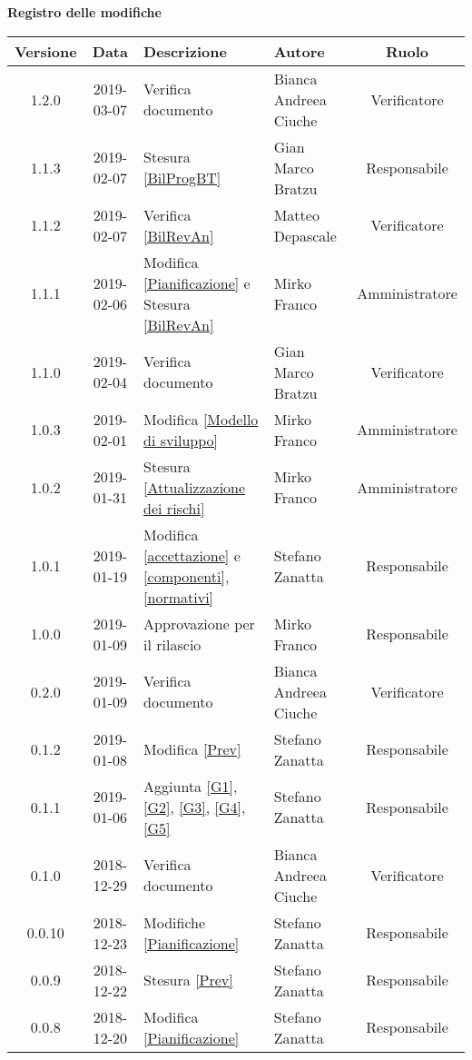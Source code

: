 	\begin{center}
		\textbf{Registro delle modifiche}
	\end{center}
	\begin{center}
		\begin{tabularx}{\textwidth}{|c|c|X|X|c|}
			\hline
			\textbf{Versione} & \textbf{Data} & \textbf{Descrizione} & \textbf{Autore} & \textbf{Ruolo} \\
			\hline
			1.2.0 & 2019-03-07 & Verifica documento & Bianca Andreea Ciuche & Verificatore \\			
			\hline
			1.1.3 & 2019-02-07 & Stesura \ref{BilProgBT} & Gian Marco Bratzu & Responsabile \\			
			\hline
			1.1.2 & 2019-02-07 & Verifica \ref{BilRevAn} & Matteo Depascale & Verificatore \\
			\hline
			1.1.1 & 2019-02-06 & Modifica \ref{Pianificazione} e Stesura \ref{BilRevAn} & Mirko Franco & Amministratore \\
			\hline
			1.1.0 & 2019-02-04 & Verifica documento & Gian Marco Bratzu & Verificatore\\
			\hline
			1.0.3 & 2019-02-01 & Modifica \ref{Modello di sviluppo} & Mirko Franco & Amministratore \\
			\hline
			1.0.2 & 2019-01-31 & Stesura \ref{Attualizzazione dei rischi} & Mirko Franco & Amministratore \\
			\hline
			1.0.1 & 2019-01-19 & Modifica \ref{accettazione} e \ref{componenti},\ref{normativi} & Stefano Zanatta & Responsabile\\
			\hline
			1.0.0 & 2019-01-09 & Approvazione per il rilascio & Mirko Franco & Responsabile\\
			\hline
			0.2.0 & 2019-01-09 & Verifica documento & Bianca Andreea Ciuche& Verificatore\\
			\hline
			0.1.2 & 2019-01-08 & Modifica \ref{Prev}& Stefano Zanatta & Responsabile\\
			\hline
			0.1.1 & 2019-01-06 & Aggiunta \ref{G1}, \ref{G2}, \ref{G3}, \ref{G4}, \ref{G5} & Stefano Zanatta & Responsabile\\
			\hline
			0.1.0 & 2018-12-29 & Verifica documento & Bianca Andreea Ciuche& Verificatore\\
			\hline
			0.0.10 & 2018-12-23 & Modifiche \ref{Pianificazione} & Stefano Zanatta & Responsabile\\
			\hline
			0.0.9 & 2018-12-22 & Stesura \ref{Prev} & Stefano Zanatta & Responsabile\\
			\hline
			0.0.8 & 2018-12-20 & Modifica \ref{Pianificazione} & Stefano Zanatta & Responsabile\\

\end{tabularx}
\end{center}
